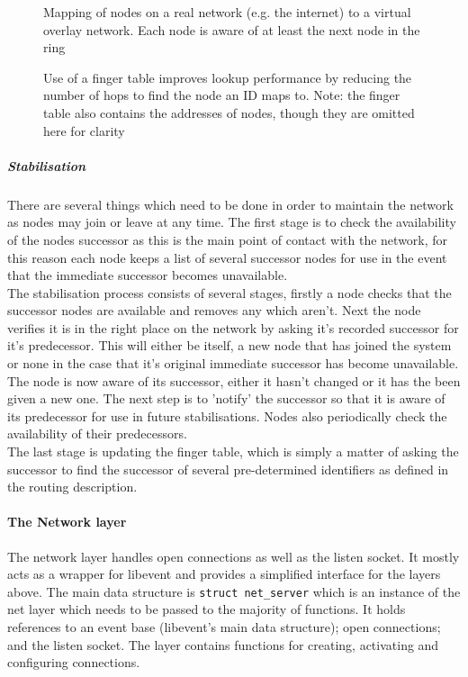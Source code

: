 \documentclass{article}
\begin{document}
\begin{figure}
\centering
\def\svgwidth{0.85\columnwidth}

\caption{Mapping of nodes on a real network (e.g. the internet) to a virtual overlay network. Each node is aware of at least the next node in the ring}
\label{fig:rtovmap}
\end{figure}


\begin{figure}
\centering
\def\svgwidth{0.85\columnwidth}

\caption[caption]{Use of a finger table improves lookup performance by reducing the number of hops to find the node an ID maps to.
Note: the finger table also contains the addresses of nodes, though they are omitted here for clarity}
\label{fig:fingersRbttr}
\end{figure}


\subparagraph{Stabilisation} There are several things which need to be done in order to maintain the network as nodes may join or leave at any time. The first stage is to check the availability of the nodes successor as this is the main point of contact with the network, for this reason each node keeps a list of several successor nodes for use in the event that the immediate successor becomes unavailable.
\\
The stabilisation process consists of several stages, firstly a node checks that the successor nodes are available and removes any which aren't.
Next the node verifies it is in the right place on the network by asking it's recorded successor for it's predecessor. This will either be itself, a new node that has joined the system or none in the case that it's original immediate successor has become unavailable. The node is now aware of its successor, either it hasn't changed or it has the been given a new one. The next step is to 'notify' the successor so that it is aware of its predecessor for use in future stabilisations.
Nodes also periodically check the availability of their predecessors.
\\
The last stage is updating the finger table, which is simply a matter of asking the successor to find the successor of several pre-determined identifiers as defined in the routing description.



\paragraph{The Network layer}
The network layer handles open connections as well as the listen socket. It mostly acts as a wrapper for libevent and provides a simplified interface for the layers above. The main data structure is \texttt{struct net\_server} which is an instance of the net layer which needs to be passed to the majority of functions. It holds references to an event base (libevent's main data structure); open connections; and the listen socket. The layer contains functions for creating, activating and configuring connections.
\end{document}
